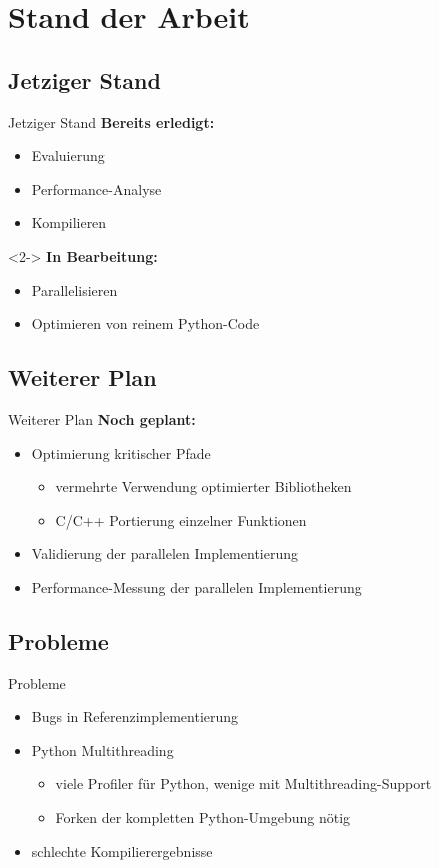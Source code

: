\section{Stand der Arbeit}

\subsection{Jetziger Stand}
\begin{frame}{Jetziger Stand}
	\textbf{Bereits erledigt:}
	\begin{itemize}
		\item Evaluierung
		\item Performance-Analyse
		\item Kompilieren
	\end{itemize}
	
	\begin{uncoverenv}<2->
		\textbf{In Bearbeitung:}
		\begin{itemize}
			\item Parallelisieren
			\item Optimieren von reinem Python-Code
		\end{itemize}
	\end{uncoverenv}
\end{frame}

\subsection{Weiterer Plan}
\begin{frame}{Weiterer Plan}
\textbf{Noch geplant:}
\begin{itemize}
	\item Optimierung kritischer Pfade
	\begin{itemize}
		\item vermehrte Verwendung optimierter Bibliotheken
		\item C/C++ Portierung einzelner Funktionen
	\end{itemize}
	\item Validierung der parallelen Implementierung
	\item Performance-Messung der parallelen Implementierung
\end{itemize}
\end{frame}

\subsection{Probleme}
\begin{frame}{Probleme}
	\begin{itemize}
		\item Bugs in Referenzimplementierung
		\item<2-> Python Multithreading
		\begin{itemize}
			\item<3-> viele Profiler für Python, wenige mit Multithreading-Support
			\item<4-> Forken der kompletten Python-Umgebung nötig
		\end{itemize}
		\item<5-> schlechte Kompilierergebnisse
	\end{itemize}
\end{frame}
